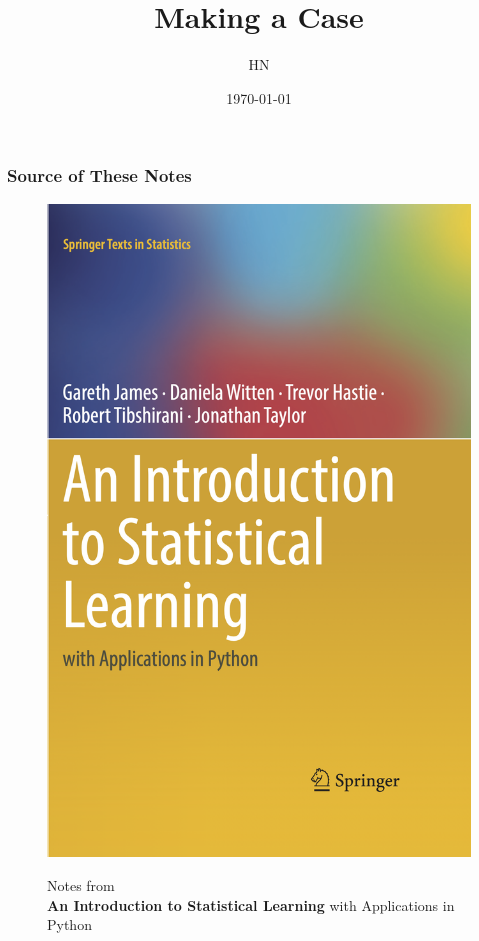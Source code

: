 \documentclass[serif, xcolor={dvipsnames}]{beamer} %
\title{Making a Case}
\author{HN}
\date{\today}
\begin{document}
\maketitle



\begin{frame}[t]
\frametitle{Source of These Notes}

\vspace{-.18in}
\begin{figure}[htbp]
    \centering
    \begin{minipage}{0.3\textwidth}
        \centering
        \includegraphics[width=\linewidth]{ISLP_cover}
    \end{minipage}%
    \hspace{.2in}
    \begin{minipage}{0.5\textwidth}
       Notes from\\ {\bf An Introduction to Statistical Learning} {\tiny with Applications in Python}
    \end{minipage}
\end{figure}


\end{frame}
\end{document}
